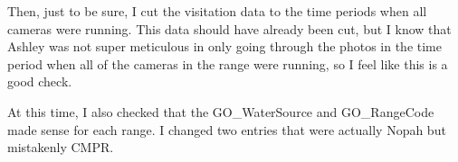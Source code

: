 \documentclass[]{article}
\newenvironment{Shaded}{\begin{snugshade}}{\end{snugshade}}
\newcommand{\KeywordTok}[1]{\textcolor[rgb]{0.13,0.29,0.53}{\textbf{#1}}}
\newcommand{\NormalTok}[1]{#1}
\newcommand{\OperatorTok}[1]{\textcolor[rgb]{0.81,0.36,0.00}{\textbf{#1}}}
\begin{document}
Then, just to be sure, I cut the visitation data to the time periods
when all cameras were running. This data should have already been cut,
but I know that Ashley was not super meticulous in only going through
the photos in the time period when all of the cameras in the range were
running, so I feel like this is a good check.

At this time, I also checked that the GO\_WaterSource and GO\_RangeCode
made sense for each range. I changed two entries that were actually
Nopah but mistakenly CMPR.

\begin{Shaded}
\end{Shaded}
\end{document}
